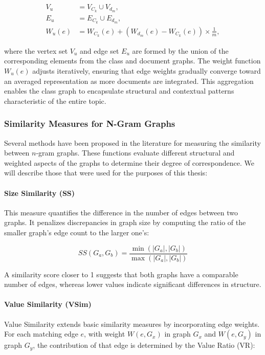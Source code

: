 \documentclass{article}
\begin{document}
\begin{align*}
    V_u &= V_{C_k} \cup V_{d_m}, \\
    E_u &= E_{C_k} \cup E_{d_m}, \\
    W_u(e) &= W_{C_k}(e) + (W_{d_m}(e) - W_{C_k}(e)) \times \frac{1}{m},
\end{align*}

where the vertex set $V_u$ and edge set $E_u$ are formed by the union of the corresponding elements from the class and document graphs. The weight function $W_u(e)$ adjusts iteratively, ensuring that edge weights gradually converge toward an averaged representation as more documents are integrated. This aggregation enables the class graph to encapsulate structural and contextual patterns characteristic of the entire topic.

\subsubsection{Similarity Measures for N-Gram Graphs} \label{sec:similarity_measures}

Several methods have been proposed in the literature for measuring the similarity between \( n \)-gram graphs. These functions evaluate different structural and weighted aspects of the graphs to determine their degree of correspondence. We will describe those that were used for the purposes of this thesis:

\paragraph{Size Similarity (SS)}

This measure quantifies the difference in the number of edges between two graphs. It penalizes discrepancies in graph size by computing the ratio of the smaller graph's edge count to the larger one's:

\[
SS(G_a, G_b) = \frac{\min(|G_a|, |G_b|)}{\max(|G_a|, |G_b|)}
\]

A similarity score closer to 1 suggests that both graphs have a comparable number of edges, whereas lower values indicate significant differences in structure.

\paragraph{Value Similarity (VSim)}

Value Similarity extends basic similarity measures by incorporating edge weights. For each matching edge \( e \), with weight \( W(e, G_x) \) in graph \( G_x \) and \( W(e, G_y) \) in graph \( G_y \), the contribution of that edge is determined by the Value Ratio (VR):
\end{document}
